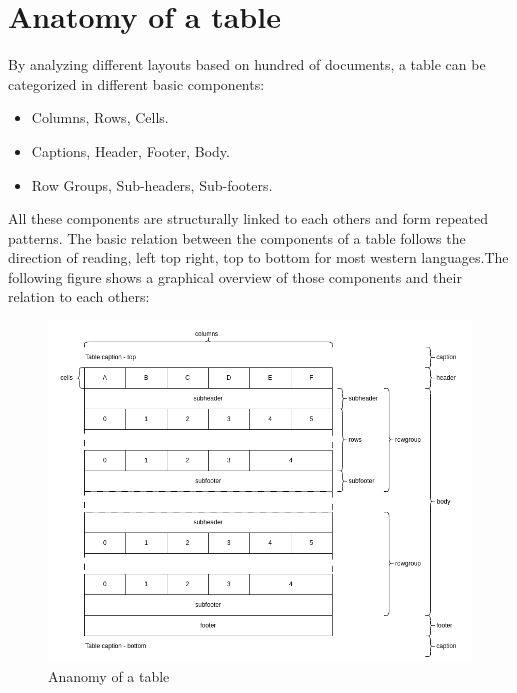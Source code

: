 \documentclass{article}
\begin{document}
\section{Anatomy of a table}
By analyzing different layouts based on hundred of documents, a table can be categorized in different basic components:
\begin{itemize}
    \item Columns, Rows, Cells.
    \item Captions, Header, Footer, Body.
    \item Row Groups, Sub-headers, Sub-footers.
\end{itemize}
All these components are structurally linked to each others and form repeated patterns. The basic relation between the
components of a table follows the direction of reading, left top right, top to bottom for most western languages.The
following figure shows a graphical overview of those components and their relation to each others:
\begin{figure}[H]
\caption{Ananomy of a table}
\includegraphics[width=\columnwidth]{table_anatomy.drawio}
\end{figure}
\end{document}
